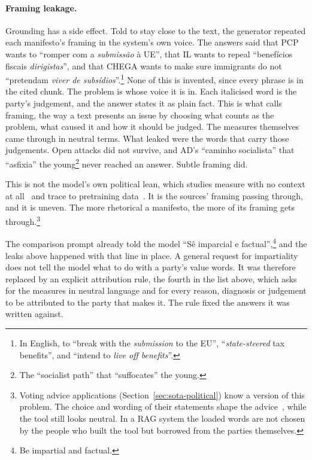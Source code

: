 \paragraph{Framing leakage.} Grounding has a side effect. Told to stay close
to the text, the generator repeated each manifesto's framing in the system's
own voice. The answers said that PCP wants to ``romper com a
\emph{submissão} à UE'', that IL wants to repeal ``benefícios fiscais
\emph{dirigistas}'', and that CHEGA wants to make sure immigrants do not
``pretendam \emph{viver de subsídios}''.\footnote{In English, to ``break with
the \emph{submission} to the EU'', ``\emph{state-steered} tax benefits'', and
``intend to \emph{live off benefits}''.} None of this is invented, since every
phrase is in the cited chunk. The problem is whose voice it is in. Each
italicised word is the party's judgement, and the answer states it as plain
fact. This is what \citet{entman1993framing} calls framing, the way a text
presents an issue by choosing what counts as the problem, what caused it and
how it should be judged. The measures themselves came through in neutral
terms. What leaked were the words that carry those judgements. Open attacks
did not survive, and AD's ``caminho socialista'' that ``asfixia'' the
young\footnote{The ``socialist path'' that ``suffocates'' the young.} never
reached an answer. Subtle framing did.

This is not the model's own political lean, which studies measure with no
context at all~\citep{rozado2024political,motoki2024more} and trace to
pretraining data~\citep{pretraining-political-bias}. It is the sources'
framing passing through, and it is uneven. The more rhetorical a manifesto,
the more of its framing gets through.\footnote{Voting advice applications
(Section~\ref{sec:sota-political}) know a version of this problem. The choice
and wording of their statements shape the advice~\citep{walgrave2009statement},
while the tool still looks neutral. In a RAG system the loaded words are not
chosen by the people who built the tool but borrowed from the parties
themselves.}

The comparison prompt already told the model ``Sê imparcial e
factual'',\footnote{Be impartial and factual.} and the leaks above happened
with that line in place. A general request for impartiality does not tell the
model what to do with a party's value words. It was therefore replaced by an
explicit attribution rule, the fourth in the list above, which asks for the
measures in neutral language and for every reason, diagnosis or judgement to be
attributed to the party that makes it. The rule fixed the answers it was
written against.

